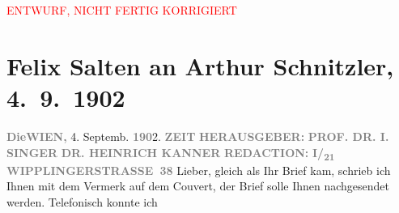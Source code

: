 
\begin{center}
            \textcolor{red}{ENTWURF, NICHT FERTIG KORRIGIERT}
                      \end{center}
            
         
         \renewcommand{\erwaehntePersonen}{Personen: Heinrich Kanner, Isidor Singer}
         \renewcommand{\erwaehnteInstitutionen}{Institutionen: Die Zeit}
         \renewcommand{\erwaehnteOrte}{Orte: Wien, Wipplingerstraße}
         \renewcommand{\erwaehnteWerke}{Werke: Die griechische Tänzerin. Novellette, Die kleine Veronika. Novelle}
               \section[Felix Salten an Arthur Schnitzler, 4. 9. 1902]{ Felix Salten an Arthur Schnitzler, 4. 9. 1902}\nopagebreak{}\rehead{ }\begin{ledgroupsized}[t]{13cm}\normalsize\beginnumbering \toendnotes[C]{\smallbreak\pagebreak[2]} 
\toendnotes[C]{\smallbreak}\pstart
           \noindent{}{\pb}\textcolor{gray}{\textbf{Die}}\hfill \textcolor{gray}{\textbf{WIEN,}}{ }4. Septemb. \textcolor{gray}{\textbf{190}}2.\pend
           \pstart
           \textcolor{gray}{\textbf{ZEIT}}\pend
           \pstart
           \textcolor{gray}{\textbf{HERAUSGEBER:}}\pend
           \pstart
           \textcolor{gray}{\textbf{PROF. DR. I. SINGER}}\pend
           \pstart
           \textcolor{gray}{\textbf{DR. HEINRICH KANNER}}\pend
           \pstart
           \textcolor{gray}{\textbf{REDACTION:}}\pend
           \pstart
           \textcolor{gray}{\textbf{I/\textsubscript{21} WIPPLINGERSTRASSE 38}}\pend
           \pstart
           Lieber, gleich als Ihr Brief kam, schrieb ich Ihnen mit dem Vermerk
               auf dem Couvert, der Brief solle Ihnen nachgesendet werden. Telefonisch konnte ich

\end{ledgroupsized}

